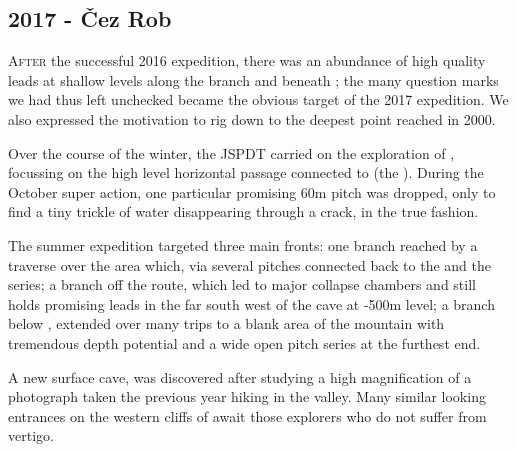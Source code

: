 \newpage
  
\begin{tcolorbox}

\chapter{2017 - Čez Rob}
	
	\lettrine{A}{fter} the successful 2016 expedition, there was an abundance of high quality leads at shallow levels along the  branch and beneath ; the many question marks we had thus left unchecked became the obvious target of the 2017 expedition. We also expressed the motivation to rig down to the deepest point reached in 2000.

	Over the course of the winter, the JSPDT carried on the exploration of , focussing on the high level horizontal passage connected to  (the ). During the October super action, one particular promising 60m pitch was dropped, only to find a tiny trickle of water disappearing through a crack, in the true  fashion.

	The summer expedition targeted three main fronts: one branch reached by a traverse over the  area which, via several pitches connected back to the  and the  series; a branch off the  route, which led to major collapse chambers and still holds promising leads in the far south west of the cave at -500m level; a branch below , extended over many trips to a blank area of the mountain with tremendous depth potential and a wide open pitch series at the furthest end.

	A new surface cave,  was discovered after studying a high magnification of a photograph taken the previous year hiking in the  valley. Many similar looking entrances on the western cliffs of  await those explorers who do not suffer from vertigo.

\end{tcolorbox}

